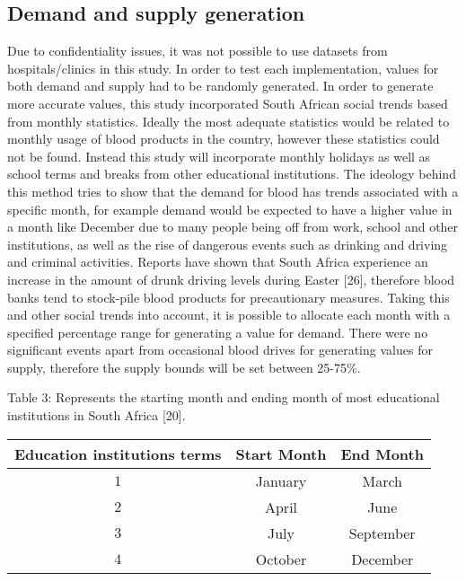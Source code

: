\documentclass{article}
\begin{document}
\subsection{Demand and supply generation}
Due to confidentiality issues, it was not possible to use datasets from hospitals/clinics in this study. In order to test each implementation, values for both demand and supply had to be randomly generated. In order to generate more accurate values, this study incorporated South African social trends based from monthly statistics. Ideally the most adequate statistics would be related to monthly usage of blood products in the country, however these statistics could not be found. Instead this study will incorporate monthly holidays as well as school terms and breaks from other educational institutions. The ideology behind this method tries to show that the demand for blood has trends associated with a specific month, for example demand would be expected to have a higher value in a month like December due to many people being off from work, school and other institutions, as well as the rise of dangerous events such as drinking and driving and criminal activities. Reports have shown that South Africa experience an increase in the amount of drunk driving levels during Easter [26], therefore blood banks tend to stock-pile blood products for precautionary measures. Taking this and other social trends into account, it is possible to allocate each month with a specified percentage range for generating a value for demand. There were no significant events apart from occasional blood drives for generating values for supply, therefore the supply bounds will be set between 25-75\%. 
\begin {center}
Table 3: {Represents the starting month and ending month of most educational institutions in South Africa [20].}

\end {center}
\begin{center}
\begin {tabular}{|c|c|c|}
\hline

Education institutions terms& Start Month&End Month \\ [0.5ex]
\hline

 $1$&January&March\\
  $2$&April&June\\
   $3$&July&September\\
    $4$&October&December\\
\hline

\end {tabular}

\end {center}
\end{document}
